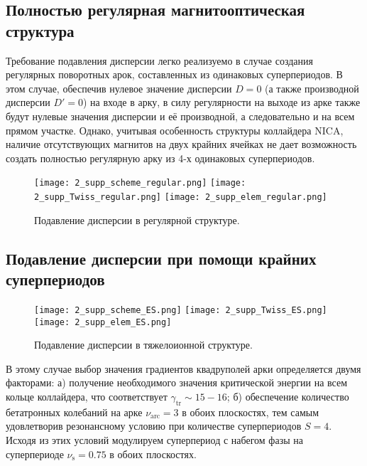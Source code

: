\subsection{Полностью регулярная магнитооптическая структура}\label{subsec:transition_variation/disp_supperssion/regular}

\par Требование подавления дисперсии легко реализуемо в случае создания регулярных поворотных арок, составленных из одинаковых суперпериодов. В этом случае, обеспечив нулевое значение дисперсии $D=0$ (а также производной дисперсии $D{\prime}=0$) на входе в арку, в силу регулярности на выходе из арке также будут нулевые значения дисперсии и её производной, а следовательно и на всем прямом участке. Однако, учитывая особенность структуры коллайдера NICA, наличие отсутствующих магнитов на двух крайних ячейках не дает возможность создать полностью регулярную арку из 4-х одинаковых суперпериодов.

\begin{figure} [h!]
   \center
   \texttt{[image: 2\_supp\_scheme\_regular.png]}
   \texttt{[image: 2\_supp\_Twiss\_regular.png]}
   \texttt{[image: 2\_supp\_elem\_regular.png]}
   \caption{Подавление дисперсии в регулярной структуре.}
   \label{fig:2_disp_supp_full_regular}
\end{figure}
	
\subsection{Подавление дисперсии при помощи крайних суперпериодов}\label{subsec:transition_variation/disp_supperssion/ES}

\par	
\begin{figure} [h!]
   \center
   \texttt{[image: 2\_supp\_scheme\_ES.png]}
   \texttt{[image: 2\_supp\_Twiss\_ES.png]}
   \texttt{[image: 2\_supp\_elem\_ES.png]}
   \caption{Подавление дисперсии в тяжелоионной структуре.}
   \label{fig:2_disp_supp_ES}
\end{figure}		

\par В этому случае выбор значения градиентов квадруполей арки определяется двумя факторами:
	а) получение необходимого значения критической энергии на всем кольце коллайдера, что соответствует $\gamma_{\text{tr}}\sim15-16$;
	б) обеспечение количество бетатронных колебаний на арке $\nu_{\text{arc}}=3$ в обоих плоскостях, тем самым удовлетворив резонансному условию при количестве суперпериодов $S=4$. Исходя из этих условий модулируем суперпериод с набегом фазы на суперпериоде $\nu_{\text{s}}=0.75$ в обоих плоскостях.

